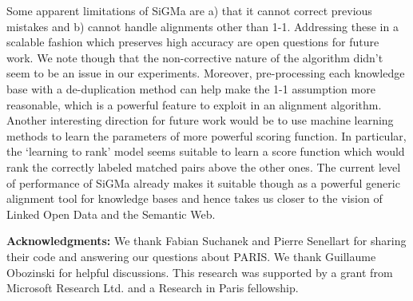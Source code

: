 \documentclass{sig-alternate}
\newcommand{\ts}[1]{\textsf{#1}}
\begin{document}
Some apparent limitations of \ts{SiGMa} are a) that it cannot correct previous mistakes and b) cannot handle alignments other than 1-1. Addressing these in a scalable fashion which preserves high accuracy are open questions for future work. We note though that the non-corrective nature of the algorithm didn't seem to be an issue in our experiments. Moreover, pre-processing each knowledge base with a de-duplication method can help make the 1-1 assumption more reasonable, which is a powerful feature to exploit in an alignment algorithm. Another interesting direction for future work would be to use machine learning methods to learn the parameters of more powerful scoring function. In particular, the `learning to rank' model seems suitable to learn a score function which would rank the correctly labeled matched pairs above the other ones. The current level of performance of \ts{SiGMa} already makes it suitable though as a powerful generic alignment tool for knowledge bases and hence takes us closer to the vision of Linked Open Data and the Semantic Web.

\textbf{Acknowledgments:} We thank Fabian Suchanek and Pierre Senellart for sharing their code and answering our questions about \ts{PARIS}. We thank Guillaume Obozinski for helpful discussions. This research was supported by a grant from Microsoft Research Ltd. and a Research in Paris fellowship.


%
%
%
%
%
%
%
%
%
%
%
%
%

%

%
%
%

%


\small{}

\clearpage
\end{document}
